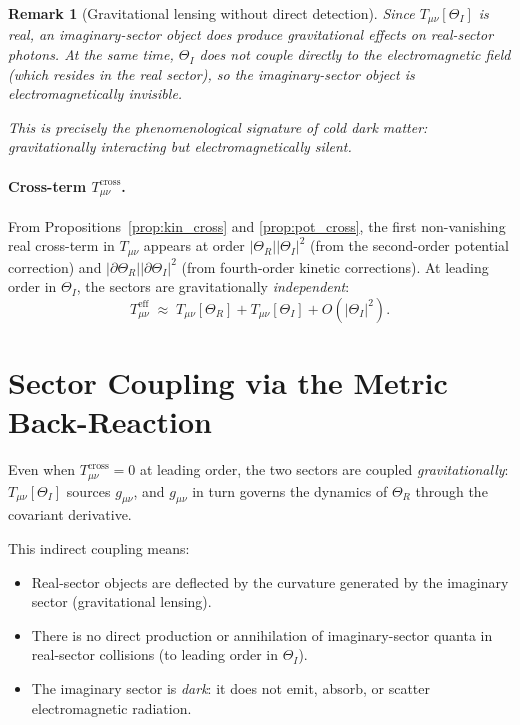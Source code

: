 \documentclass[12pt]{article}
\newtheorem{remark}{Remark}
\begin{document}
\begin{remark}[Gravitational lensing without direct detection]
Since $T_{\mu\nu}[\Theta_I]$ is real, an imaginary-sector object
\emph{does} produce gravitational effects on real-sector photons.
At the same time, $\Theta_I$ does not couple directly to the
electromagnetic field (which resides in the real sector), so the
imaginary-sector object is electromagnetically invisible.

This is precisely the phenomenological signature of cold dark matter:
gravitationally interacting but electromagnetically silent.
\end{remark}

\paragraph{Cross-term $T_{\mu\nu}^{\mathrm{cross}}$.}
From Propositions~\ref{prop:kin_cross} and \ref{prop:pot_cross},
the first non-vanishing real cross-term in $T_{\mu\nu}$ appears at
order $|\Theta_R||\Theta_I|^2$ (from the second-order potential
correction) and $|\partial\Theta_R||\partial\Theta_I|^2$ (from
fourth-order kinetic corrections).  At leading order in $\Theta_I$,
the sectors are gravitationally \emph{independent}:
\begin{equation}
  T_{\mu\nu}^{\mathrm{eff}}
  \;\approx\; T_{\mu\nu}[\Theta_R] + T_{\mu\nu}[\Theta_I]
  + O(|\Theta_I|^2).
\end{equation}

\section{Sector Coupling via the Metric Back-Reaction}

Even when $T_{\mu\nu}^{\mathrm{cross}} = 0$ at leading order,
the two sectors are coupled \emph{gravitationally}: $T_{\mu\nu}[\Theta_I]$
sources $g_{\mu\nu}$, and $g_{\mu\nu}$ in turn governs the
dynamics of $\Theta_R$ through the covariant derivative.

This indirect coupling means:
\begin{itemize}
  \item Real-sector objects are deflected by the curvature generated
    by the imaginary sector (gravitational lensing).
  \item There is no direct production or annihilation of imaginary-sector
    quanta in real-sector collisions (to leading order in $\Theta_I$).
  \item The imaginary sector is \emph{dark}: it does not emit, absorb,
    or scatter electromagnetic radiation.
\end{itemize}
\end{document}
